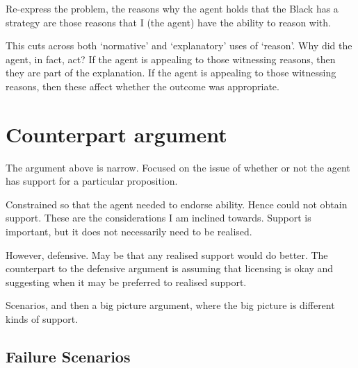 \documentclass[10pt]{article}
\newcommand{\hozlinedash}[0]{%
  \noindent\hdashrule[0.5ex][c]{\textwidth}{.1pt}{2.5pt}
}
\begin{document}
  Re-express the problem, the reasons why the agent holds that the Black has a strategy are those reasons that I (the agent) have the ability to reason with.

  This cuts across both `normative' and `explanatory' uses of `reason'.
  Why did the agent, in fact, act?
  If the agent is appealing to those witnessing reasons, then they are part of the explanation.
  If the agent is appealing to those witnessing reasons, then these affect whether the outcome was appropriate.

\hozlinedash

\section{Counterpart argument}
\label{sec:counterpart-argument}

The argument above is narrow.
Focused on the issue of whether or not the agent has support for a particular proposition.

Constrained so that the agent needed to endorse ability.
Hence could not obtain support.
These are the considerations I am inclined towards.
Support is important, but it does not necessarily need to be realised.

However, defensive.
May be that any realised support would do better.
The counterpart to the defensive argument is assuming that licensing is okay and suggesting when it may be preferred to realised support.

Scenarios, and then a big picture argument, where the big picture is different kinds of support.

\subsection{Failure Scenarios}
\label{sec:failure-scenarios}
\end{document}
